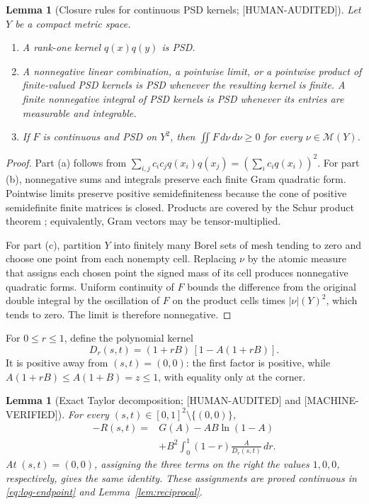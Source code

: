 \documentclass[11pt]{article}
\theoremstyle{plain}
\newtheorem{lemma}[theorem]{Lemma}
\theoremstyle{definition}
\theoremstyle{remark}
\newcommand{\M}{\mathcal M}
\newcommand{\status}[1]{\textnormal{\textsf{\footnotesize[#1]}}}
\newcommand{\MachineVerified}{\status{MACHINE-VERIFIED}}
\newcommand{\HumanAudited}{\status{HUMAN-AUDITED}}
\begin{document}
\begin{lemma}[Closure rules for continuous PSD kernels;
\HumanAudited]
\label{lem:psd-closure}
Let \(Y\) be a compact metric space.
\begin{enumerate}[label=(\alph*)]
  \item A rank-one kernel \(q(x)q(y)\) is PSD.
  \item A nonnegative linear combination, a pointwise limit, or a pointwise
        product of finite-valued PSD kernels is PSD whenever the resulting
        kernel is finite.  A finite nonnegative integral of PSD kernels is
        PSD whenever its entries are measurable and integrable.
  \item If \(F\) is continuous and PSD on \(Y^2\), then
        \(\iint F\,d\nu\,d\nu\ge0\) for every \(\nu\in\M(Y)\).
\end{enumerate}
\end{lemma}

\begin{proof}
Part (a) follows from
\(\sum_{i,j}c_ic_jq(x_i)q(x_j)=(\sum_i c_iq(x_i))^2\).
For part (b), nonnegative sums and integrals preserve each finite Gram
quadratic form.  Pointwise limits preserve positive semidefiniteness because
the cone of positive semidefinite finite matrices is closed.  Products are
covered by the Schur product theorem \cite[Theorem~7.5.3]{horn-johnson};
equivalently, Gram vectors may be tensor-multiplied.

For part (c), partition \(Y\) into finitely many Borel sets of mesh tending to
zero and choose one point from each nonempty cell.  Replacing \(\nu\) by the
atomic measure that assigns each chosen point the signed mass of its cell
produces nonnegative quadratic forms.  Uniform continuity of \(F\) bounds the
difference from the original double integral by the oscillation of \(F\) on
the product cells times \(\lvert\nu\rvert(Y)^2\), which tends to zero.  The
limit is therefore nonnegative.
\end{proof}

For \(0\le r\le1\), define the polynomial kernel
\begin{equation}
  D_r(s,t)=(1+rB)\,[1-A(1+rB)].
  \label{eq:D-definition}
\end{equation}
It is positive away from \((s,t)=(0,0)\): the first factor is positive, while
\(A(1+rB)\le A(1+B)=z\le1\), with equality only at the corner.

\begin{lemma}[Exact Taylor decomposition; \HumanAudited{} and
\MachineVerified]
\label{lem:taylor}
For every \((s,t)\in[0,1]^2\setminus\{(0,0)\}\),
\begin{equation}
\begin{split}
  -R(s,t)
  ={}&G(A)-AB\ln(1-A)\\
     &+B^2\int_0^1(1-r)\frac{A}{D_r(s,t)}\,dr.
\end{split}
\label{eq:taylor-decomposition}
\end{equation}
At \((s,t)=(0,0)\), assigning the three terms on the right the values
\(1,0,0\), respectively, gives the same identity.  These assignments are
proved continuous in \eqref{eq:log-endpoint} and
Lemma~\ref{lem:reciprocal}.
\end{lemma}
\end{document}
